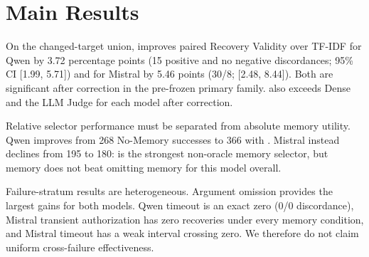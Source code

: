 \section{Main Results}




On the changed-target union, \proper{} improves paired Recovery Validity over TF-IDF for Qwen by 3.72 percentage points (15 positive and no negative discordances; 95\% CI [1.99, 5.71]) and for Mistral by 5.46 points (30/8; [2.48, 8.44]). Both are significant after correction in the pre-frozen primary family. \proper{} also exceeds Dense and the LLM Judge for each model after correction.

Relative selector performance must be separated from absolute memory utility. Qwen improves from 268 No-Memory successes to 366 with \proper. Mistral instead declines from 195 to 180: \proper{} is the strongest non-oracle memory selector, but memory does not beat omitting memory for this model overall.

Failure-stratum results are heterogeneous. Argument omission provides the largest gains for both models. Qwen timeout is an exact zero (0/0 discordance), Mistral transient authorization has zero recoveries under every memory condition, and Mistral timeout has a weak interval crossing zero. We therefore do not claim uniform cross-failure effectiveness.
